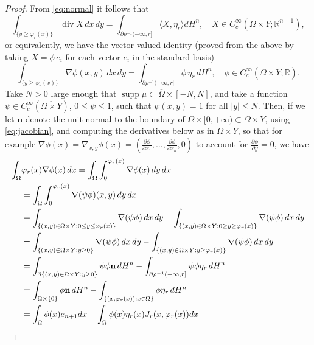 \documentclass{article}
\newcommand{\R}{\mathbb{R}}
\theoremstyle{definition}
\theoremstyle{remark}
\begin{document}
\begin{proof}
 From \eqref{eq:normal} it follows that
 \[\int_{\{y\geq \varphi_r(x)\}}\operatorname{div}X\,dx\,dy=\int_{\partial \rho^{-1}(-\infty,r]} \langle X,\eta_r\rangle d H^n,\quad X\in C^\infty_c(\overline{\Omega\times Y};\R^{n+1}),\]
 or equivalently, we have the vector-valued identity (proved from the above by taking $X=\phi \,e_i$ for each vector $e_i$ in the standard basis)
 \begin{equation}\label{eq:previouslydisplayedidentity}
 \int_{\{y\geq \varphi_r(x)\}}\nabla \phi(x,y)\,dx\,dy=\int_{\partial \rho^{-1}(-\infty,r]} \phi\, \eta_r\, d H^n,\quad \phi\in C^\infty_c(\overline{\Omega\times Y};\R).
 \end{equation}
%
%
%
%
%
%
%
%
%
%
%
%
%
 Take $N>0$ large enough that $\operatorname{supp}\mu\subset\overline\Omega\times[-N,N]$, and take a function $\psi\in C^\infty_c(\overline{\Omega\times Y})$, $0\leq\psi\leq 1$, such that $\psi(x,y)=1$ for all $|y|\leq N$. 
  Then, if we let $\mathbf n$ denote the unit normal to the boundary of $\Omega\times [0,+\infty)\subset\Omega\times Y$,  using \eqref{eq:jacobian}, and computing the derivatives below as in $\Omega\times Y$, so that for example $\nabla \phi(x)=\nabla_{x,y} \phi(x)=(\frac{\partial\phi}{\partial x_1},\dots,\frac{\partial\phi}{\partial x_n},0)$ to account for $\frac{\partial\phi}{\partial y}=0$, we have
 \begin{align*}
     \int_\Omega&\varphi_r(x)\nabla\phi(x)\,dx= \int_\Omega\int_0^{\varphi_r(x)}\nabla \phi(x)\,dy\,dx\\
     &=\int_\Omega\int_0^{\varphi_r(x)}\nabla (\psi\phi)(x,y)\,dy\,dx\\
     \notag &=\int_{\{(x,y)\in\Omega\times Y:0\leq y\leq \varphi_r(x)\}}\nabla(\psi\phi)\,dx\,dy
     -\int_{\{(x,y)\in\Omega\times Y:0\geq y\geq \varphi_r(x)\}}\nabla(\psi\phi)\,dx\,dy \\
     \notag &=\int_{\{(x,y)\in\Omega\times Y:y\geq 0\}}\nabla(\psi\phi)\,dx\,dy-\int_{\{(x,y)\in\Omega\times Y:y\geq \varphi_r(x)\}}\nabla(\psi\phi)\,dx\,dy \\
     \notag &=\int_{\partial\{(x,y)\in\Omega\times Y:y\geq 0\}} \psi\phi\mathbf{n}\,dH^n-\int_{\partial\rho^{-1}(-\infty,r]} \psi\phi\eta_r\,dH^n\\
     \notag &=\int_{\Omega\times \{0\}} \phi\mathbf{n}\,dH^n-\int_{\{(x,\varphi_r(x)):x\in\Omega\}} \phi\eta_r\,dH^n\\
     &=\int_\Omega \phi(x)e_{n+1}dx+\int_\Omega\phi(x)\eta_r(x)J_r(x,\varphi_r(x))%
     dx
 \end{align*}

\end{proof}
\end{document}
